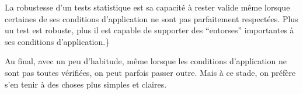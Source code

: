\documentclass[
  french,
  a4paper,
  DIV=11,
  numbers=noendperiod,
  oneside]{scrreprt}
\begin{document}
\begin{tcolorbox}[enhanced jigsaw, arc=.35mm, bottomrule=.15mm, bottomtitle=1mm, breakable, colback=white, colbacktitle=quarto-callout-tip-color!10!white, colframe=quarto-callout-tip-color-frame, coltitle=black, left=2mm, leftrule=.75mm, opacityback=0, opacitybacktitle=0.6, rightrule=.15mm, title=\textcolor{quarto-callout-tip-color}{\faLightbulb}\hspace{0.5em}{Robustesse}, titlerule=0mm, toprule=.15mm, toptitle=1mm]

La robustesse d'un tests statistique est sa capacité à rester valide
même lorsque certaines de ses conditions d'application ne sont pas
parfaitement respectées. Plus un test est robuste, plus il est capable
de supporter des ``entorses'' importantes à ses conditions
d'application.\}

\end{tcolorbox}

Au final, avec un peu d'habitude, même lorsque les conditions
d'application ne sont pas toutes vérifiées, on peut parfois passer
outre. Mais à ce stade, on préfère s'en tenir à des choses plus simples
et claires.
\end{document}
